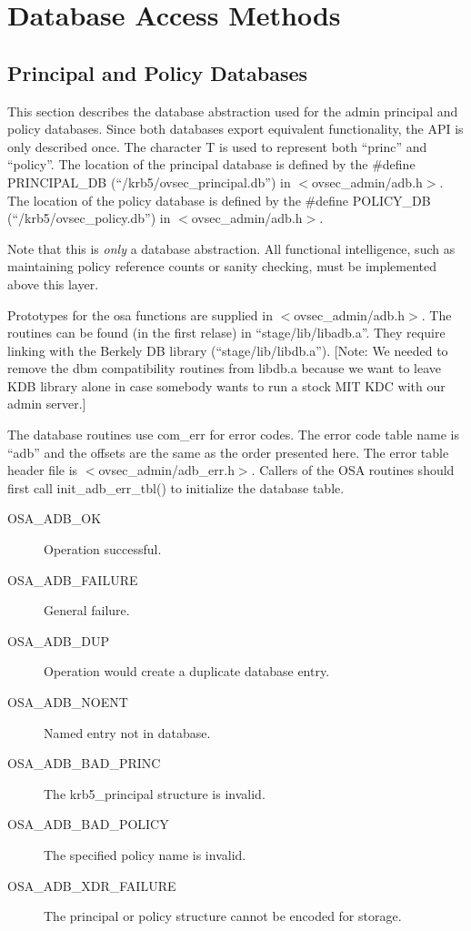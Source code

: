\section{Database Access Methods}

\subsection{Principal and Policy Databases}

This section describes the database abstraction used for the admin
principal and policy databases.  Since both databases export
equivalent functionality, the API is only described once.  The
character T is used to represent both ``princ'' and ``policy''. The
location of the principal database is defined by the \#define
PRINCIPAL_DB (``/krb5/ovsec_principal.db'') in $<$ovsec_admin/adb.h$>$. The
location of the policy database is defined by the \#define POLICY_DB
(``/krb5/ovsec_policy.db'') in $<$ovsec_admin/adb.h$>$.

Note that this is {\it only} a database abstraction.  All functional
intelligence, such as maintaining policy reference counts or sanity
checking, must be implemented above this layer.

Prototypes for the osa functions are supplied in
$<$ovsec_admin/adb.h$>$. The routines can be found (in the first
relase) in ``stage/lib/libadb.a''. They require linking with the
Berkely DB library (``stage/lib/libdb.a''). [Note: We needed to remove
the dbm compatibility routines from libdb.a because we want to leave
KDB library alone in case somebody wants to run a stock MIT KDC with
our admin server.]

The database routines use com_err for error codes.  The error code
table name is ``adb'' and the offsets are the same as the order
presented here. The error table header file is
$<$ovsec_admin/adb_err.h$>$. Callers of the OSA routines should first call
init_adb_err_tbl() to initialize the database table.

\begin{description}
\item[OSA_ADB_OK] Operation successful.
\item[OSA_ADB_FAILURE] General failure.
\item[OSA_ADB_DUP] Operation would create a duplicate database entry.
\item[OSA_ADB_NOENT] Named entry not in database.
\item[OSA_ADB_BAD_PRINC] The krb5_principal structure is invalid.
\item[OSA_ADB_BAD_POLICY] The specified policy name is invalid.
\item[OSA_ADB_XDR_FAILURE] The principal or policy structure cannot be
encoded for storage.
\end{description}

